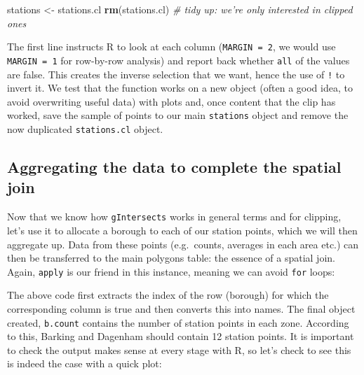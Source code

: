 \documentclass[]{article}
\newenvironment{Shaded}{}{}
\newcommand{\KeywordTok}[1]{\textcolor[rgb]{0.00,0.44,0.13}{\textbf{{#1}}}}
\newcommand{\DataTypeTok}[1]{\textcolor[rgb]{0.56,0.13,0.00}{{#1}}}
\newcommand{\DecValTok}[1]{\textcolor[rgb]{0.25,0.63,0.44}{{#1}}}
\newcommand{\CommentTok}[1]{\textcolor[rgb]{0.38,0.63,0.69}{\textit{{#1}}}}
\newcommand{\NormalTok}[1]{{#1}}
\begin{document}
\begin{Shaded}
\begin{Highlighting}[]
\NormalTok{stations <- stations.cl}
\KeywordTok{rm}\NormalTok{(stations.cl)  }\CommentTok{# tidy up: we're only interested in clipped ones}
\end{Highlighting}
\end{Shaded}
The first line instructs R to look at each column (\texttt{MARGIN = 2},
we would use \texttt{MARGIN = 1} for row-by-row analysis) and report
back whether \texttt{all} of the values are false. This creates the
inverse selection that we want, hence the use of \texttt{!} to invert
it. We test that the function works on a new object (often a good idea,
to avoid overwriting useful data) with plots and, once content that the
clip has worked, save the sample of points to our main \texttt{stations}
object and remove the now duplicated \texttt{stations.cl} object.

\subsection{Aggregating the data to complete the spatial join}

Now that we know how \texttt{gIntersects} works in general terms and for
clipping, let's use it to allocate a borough to each of our station
points, which we will then aggregate up. Data from these points
(e.g.~counts, averages in each area etc.) can then be transferred to the
main polygons table: the essence of a spatial join. Again,
\texttt{apply} is our friend in this instance, meaning we can avoid
\texttt{for} loops:

\begin{Shaded}
\end{Shaded}
The above code first extracts the index of the row (borough) for which
the corresponding column is true and then converts this into names. The
final object created, \texttt{b.count} contains the number of station
points in each zone. According to this, Barking and Dagenham should
contain 12 station points. It is important to check the output makes
sense at every stage with R, so let's check to see this is indeed the
case with a quick plot:
\end{document}
